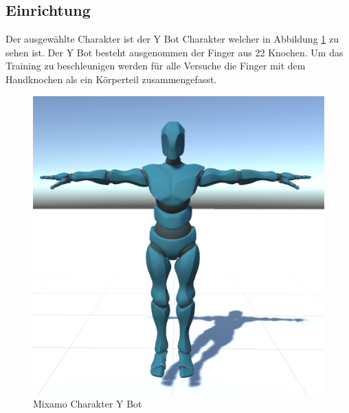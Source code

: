 \subsection{Einrichtung}
Der ausgewählte Charakter ist der Y Bot Charakter welcher in Abbildung \ref{fig:charakter_mixamo} zu sehen ist. Der Y Bot besteht ausgenommen der Finger aus 22 Knochen. Um das Training zu beschleunigen werden für alle Versuche die Finger mit dem Handknochen als ein Körperteil zusammengefasst.

\begin{figure}[H]
  \centering  
  \includegraphics[scale=0.5]{img/charakter_mixamo}
  \caption{Mixamo Charakter Y Bot}
  \label{fig:charakter_mixamo}
\end{figure}


